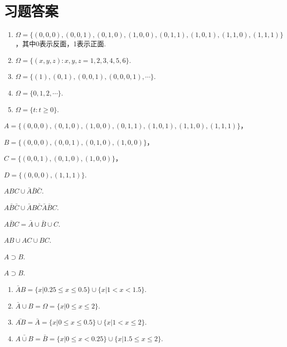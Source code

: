 \chapter*{习题答案}

\setcounter{chapter}{1}
\setcounter{section}{0}
\begin{answer}
  \item \begin{enumerate}
    \item $\Omega= \{(0,0,0),(0,0,1),(0,1,0),(1,0,0),(0,1,1),(1,0,1),
        (1,1,0),(1,1,1)\}$，其中0表示反面，1表示正面.
    \item $\Omega=\{(x,y,z):x,y,z=1,2,3,4,5,6\}$.
    \item $\Omega=\{(1),(0,1),(0,0,1),(0,0,0,1),\cdots\}$.
    \item $\Omega=\{0,1,2,\cdots\}$.
    \item $\Omega=\{t:t\ge0\}$.
  \end{enumerate}

  \item $A=\{(0,0,0),(0,1,0),(1,0,0),(0,1,1),(1,0,1),(1,1,0),(1,1,1)\}$，

    $B=\{(0,0,0),(0,0,1),(0,1,0),(1,0,0)\}$，

    $C=\{(0,0,1),(0,1,0),(1,0,0)\}$，

    $D=\{(0,0,0),(1,1,1)\}$.

  \item \begin{enumerate*}
    \item $ABC\cup \bar A\bar B\bar C$.
    \item $A\bar B\bar C\cup \bar AB\bar C\bar A\bar BC$.
    \item $\bar{ABC}=\bar A\cup \bar B\cup C$.
    \item $AB\cup AC\cup BC$.
  \end{enumerate*}

  \item \begin{enumerate*}
    \item $A\supset B$.
    \item $A\supset B$.
  \end{enumerate*}

  \item \begin{enumerate}
    \item $\bar AB=\{x|0.25\le x\le0.5\}\cup\{x|1<x<1.5\}$.
    \item $\bar A\cup B=\Omega=\{x|0\le x\le2\}$.
    \item $\bar{AB}=\bar A=\{x|0\le x\le0.5\}\cup\{x|1<x\le2\}$.
    \item $\bar{A\cup B}=\bar B=\{x|0\le x<0.25\}\cup\{x|1.5\le x\le2\}$.
  \end{enumerate}


\end{answer}
